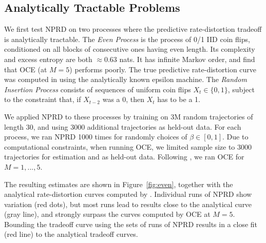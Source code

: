 \documentclass[11pt,letterpaper]{article}
\begin{document}
\subsection{Analytically Tractable Problems}\label{sec:tractable}

We first test NPRD on two processes where the predictive rate-distortion tradeoff is analytically tractable. %
The \emph{Even Process} \citep{marzen-predictive-2016} is the process of 0/1 IID coin flips, conditioned on all blocks of consecutive ones having even length.
Its complexity and excess entropy are both $\approx 0.63$ nats. %
It has infinite Markov order, and \cite{marzen-predictive-2016} find that OCE (at $M=5$) performs poorly. %
The true predictive rate-distortion curve was computed in \cite{marzen-predictive-2016} using the analytically known epsilon machine.
The \emph{Random Insertion Process} \citep{marzen-predictive-2016} consists of sequences of uniform coin flips $X_t \in \{0,1\}$, subject to the constraint that, if $X_{t-2}$ was a 0, then $X_{t}$ has to be a 1.



We applied NPRD to these processes by training on 3M random trajectories of length 30, and using 3000 additional trajectories as held-out data.
For each process, we ran NPRD 1000 times for randomly choices of $\beta \in [0,1]$.
Due to computational constraints, when running OCE, we limited sample size to 3000 trajectories for estimation and as held-out data.
Following \cite{marzen-predictive-2016}, we ran OCE for $M=1,...,5$.

The resulting estimates are shown in Figure~\ref{fig:even}, together with the analytical rate-distortion curves computed by \cite{marzen-predictive-2016}.
Individual runs of NPRD show variation (red dots), but most runs lead to results close to the analytical curve (gray line), and strongly surpass the curves computed by OCE at $M=5$.
Bounding the tradeoff curve using the sets of runs of NPRD results in a close fit (red line) to the analytical tradeoff curves.
\end{document}

